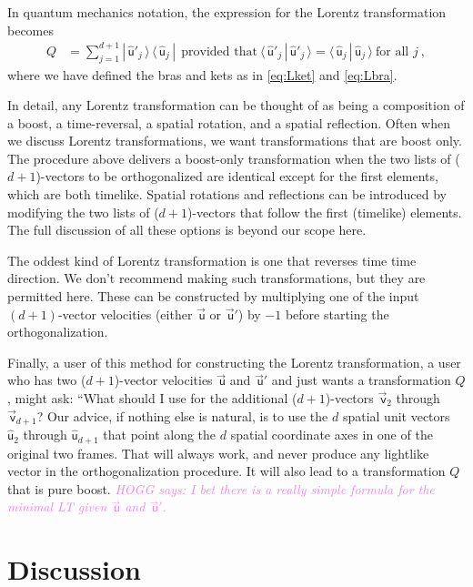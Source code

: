\documentclass{article}
\newcommand\upvec[1]{\!\vec{\,\mathrm{#1}}}
\newcommand{\Lvec}[1]{\upvec{\mathsf{#1}}} %
\newcommand{\Lhat}[1]{\hat{\mathsf{#1}}} %
\newcommand{\braket}[2]{\langle\,{#1}\,|\,{#2}\,\rangle}
\newcommand{\ketbra}[2]{|\,{#1}\,\rangle\,\langle\,{#2}\,|}
\newcommand{\plus}{\!+\!} %
\newcommand{\HOGG}[1]{\textcolor{violet}{\textsl{HOGG says: {#1}}}}
\begin{document}
In quantum mechanics notation, the expression for the Lorentz transformation becomes
\begin{align}
    Q &= \sum_{j=1}^{d+1} \ketbra{\Lhat{u}'_j}{\Lhat{u}_j} ~~ \mbox{provided that} ~ \braket{\Lhat{u}'_j}{\Lhat{u}'_j} = \braket{\Lhat{u}_j}{\Lhat{u}_j} ~ \mbox{for all $j$} ~,
\end{align}
where we have defined the bras and kets as in \eqref{eq:Lket} and \eqref{eq:Lbra}.

In detail, any Lorentz transformation can be thought of as being a composition of a boost, a time-reversal, a spatial rotation, and a spatial reflection.
Often when we discuss Lorentz transformations, we want transformations that are boost only.
The procedure above delivers a boost-only transformation when the two lists of ($d\plus1$)-vectors to be orthogonalized are identical except for the first elements, which are both timelike.
Spatial rotations and reflections can be introduced by modifying the two lists of ($d\plus1$)-vectors that follow the first (timelike) elements.
The full discussion of all these options is beyond our scope here.

The oddest kind of Lorentz transformation is one that reverses time time direction.
We don't recommend making such transformations, but they are permitted here.
These can be constructed by multiplying one of the input $(d+1)$-vector velocities (either $\Lvec{u}$ or $\Lvec{u}'$) by $-1$ before starting the orthogonalization.

Finally, a user of this method for constructing the Lorentz transformation, a user who has two ($d\plus1$)-vector velocities $\Lvec{u}$ and $\Lvec{u}'$ and just wants a transformation $Q$, might ask: ``What should I use for the additional ($d\plus1$)-vectors $\Lvec{v}_2$ through $\Lvec{v}_{d+1}$?
Our advice, if nothing else is natural, is to use the $d$ spatial unit vectors $\Lhat{u}_2$ through $\Lhat{u}_{d+1}$ that point along the $d$ spatial coordinate axes in one of the original two frames.
That will always work, and never produce any lightlike vector in the orthogonalization procedure.
It will also lead to a transformation $Q$ that is pure boost.
\HOGG{I bet there is a really simple formula for the minimal LT given $\Lvec{u}$ and $\Lvec{u}'$.}

\section{Discussion}\label{sec:discussion}
\end{document}
